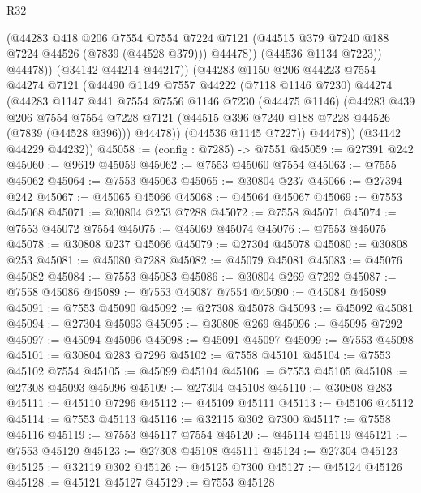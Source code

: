 \begin{lexlean}{R32}
\begin{coremodule}
                  (@44283
                    @418
                    @206
                    @7554
                    @7554
                    @7224
                    @7121
                    (@44515 @379 @7240 @188 @7224 @44526 (@7839 (@44528 @379)))
                    @44478))
                (@44536 @1134 @7223))
              @44478))
          (@34142 @44214 @44217))
        (@44283
          @1150
          @206
          @44223
          @7554
          @44274
          @7121
          (@44490
            @1149
            @7557
            @44222
            (@7118 @1146 @7230)
            @44274
            (@44283
              @1147
              @441
              @7554
              @7556
              @1146
              @7230
              (@44475 @1146)
              (@44283
                @439
                @206
                @7554
                @7554
                @7228
                @7121
                (@44515 @396 @7240 @188 @7228 @44526 (@7839 (@44528 @396)))
                @44478))
            (@44536 @1145 @7227))
          @44478))
      (@34142 @44229 @44232))
@45058 := (config : @7285) -> @7551
@45059 := @27391 @242
@45060 := @9619 @45059
@45062 := @7553 @45060 @7554
@45063 := @7555 @45062
@45064 := @7553 @45063
@45065 := @30804 @237
@45066 := @27394 @242
@45067 := @45065 @45066
@45068 := @45064 @45067
@45069 := @7553 @45068
@45071 := @30804 @253 @7288
@45072 := @7558 @45071
@45074 := @7553 @45072 @7554
@45075 := @45069 @45074
@45076 := @7553 @45075
@45078 := @30808 @237 @45066
@45079 := @27304 @45078
@45080 := @30808 @253
@45081 := @45080 @7288
@45082 := @45079 @45081
@45083 := @45076 @45082
@45084 := @7553 @45083
@45086 := @30804 @269 @7292
@45087 := @7558 @45086
@45089 := @7553 @45087 @7554
@45090 := @45084 @45089
@45091 := @7553 @45090
@45092 := @27308 @45078
@45093 := @45092 @45081
@45094 := @27304 @45093
@45095 := @30808 @269
@45096 := @45095 @7292
@45097 := @45094 @45096
@45098 := @45091 @45097
@45099 := @7553 @45098
@45101 := @30804 @283 @7296
@45102 := @7558 @45101
@45104 := @7553 @45102 @7554
@45105 := @45099 @45104
@45106 := @7553 @45105
@45108 := @27308 @45093 @45096
@45109 := @27304 @45108
@45110 := @30808 @283
@45111 := @45110 @7296
@45112 := @45109 @45111
@45113 := @45106 @45112
@45114 := @7553 @45113
@45116 := @32115 @302 @7300
@45117 := @7558 @45116
@45119 := @7553 @45117 @7554
@45120 := @45114 @45119
@45121 := @7553 @45120
@45123 := @27308 @45108 @45111
@45124 := @27304 @45123
@45125 := @32119 @302
@45126 := @45125 @7300
@45127 := @45124 @45126
@45128 := @45121 @45127
@45129 := @7553 @45128

\end{coremodule}
\end{lexlean}
